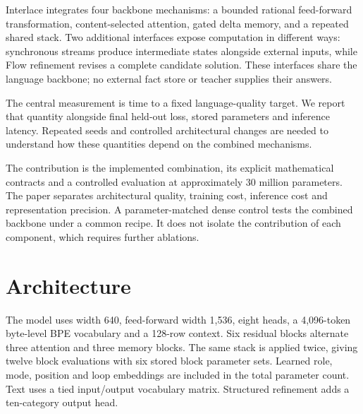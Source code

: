 \documentclass[11pt]{article}
\newcommand{\ModelName}{Interlace}
\begin{document}
\ModelName{} integrates four backbone mechanisms: a bounded rational
feed-forward transformation, content-selected attention, gated delta memory,
and a repeated shared stack. Two additional interfaces expose computation in
different ways: synchronous streams produce intermediate states alongside
external inputs, while Flow refinement revises a complete candidate solution.
These interfaces share the language backbone; no external fact store or
teacher supplies their answers.

The central measurement is time to a fixed language-quality target. We report
that quantity alongside final held-out loss, stored parameters and inference
latency. Repeated seeds and controlled architectural changes are needed to
understand how these quantities depend on the combined mechanisms.

The contribution is the implemented combination, its explicit mathematical
contracts and a controlled evaluation at approximately 30 million parameters.
The paper separates architectural quality, training cost, inference cost and
representation precision. A parameter-matched dense control tests the combined
backbone under a common recipe. It does not isolate the contribution of each
component, which requires further ablations.

\section{Architecture}
The model uses width 640, feed-forward width 1,536, eight heads, a
4,096-token byte-level BPE vocabulary and a 128-row context. Six residual blocks
alternate three attention and three memory blocks. The same stack is applied
twice, giving twelve block evaluations with six stored block parameter sets.
Learned role, mode, position and loop embeddings are included in the total
parameter count. Text uses a tied input/output vocabulary matrix. Structured
refinement adds a ten-category output head.
\end{document}
